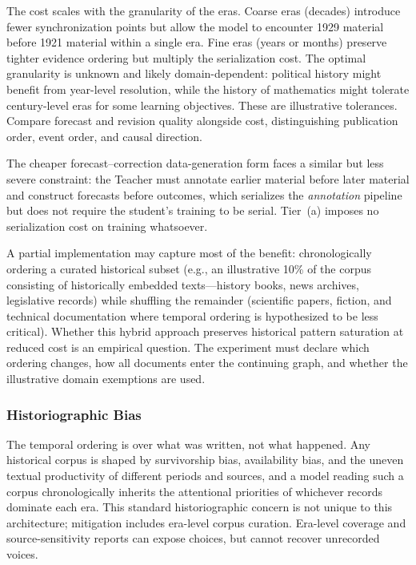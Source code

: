 \documentclass[11pt]{article}
\begin{document}
The cost scales with the granularity of the eras. Coarse eras (decades) introduce fewer synchronization points but allow the model to encounter 1929 material before 1921 material within a single era. Fine eras (years or months) preserve tighter evidence ordering but multiply the serialization cost. The optimal granularity is unknown and likely domain-dependent: political history might benefit from year-level resolution, while the history of mathematics might tolerate century-level eras for some learning objectives. These are illustrative tolerances. Compare forecast and revision quality alongside cost, distinguishing publication order, event order, and causal direction.

The cheaper forecast--correction data-generation form faces a similar but less severe constraint: the Teacher must annotate earlier material before later material and construct forecasts before outcomes, which serializes the \emph{annotation} pipeline but does not require the student's training to be serial. Tier~(a) imposes no serialization cost on training whatsoever.

A partial implementation may capture most of the benefit: chronologically ordering a curated historical subset (e.g., an illustrative 10\% of the corpus consisting of historically embedded texts---history books, news archives, legislative records) while shuffling the remainder (scientific papers, fiction, and technical documentation where temporal ordering is hypothesized to be less critical). Whether this hybrid approach preserves historical pattern saturation at reduced cost is an empirical question. The experiment must declare which ordering changes, how all documents enter the continuing graph, and whether the illustrative domain exemptions are used.

\subsubsection{Historiographic Bias}

The temporal ordering is over what was written, not what happened. Any historical corpus is shaped by survivorship bias, availability bias, and the uneven textual productivity of different periods and sources, and a model reading such a corpus chronologically inherits the attentional priorities of whichever records dominate each era. This standard historiographic concern is not unique to this architecture; mitigation includes era-level corpus curation. Era-level coverage and source-sensitivity reports can expose choices, but cannot recover unrecorded voices.
\end{document}
